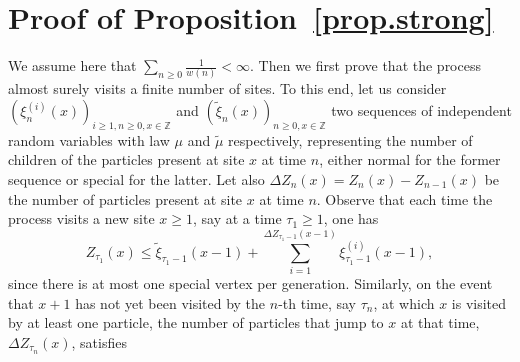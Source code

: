 \documentclass[10pt,a4paper]{amsart}
\newcommand{\1}{{\text{\Large $\mathfrak 1$}}}
\begin{document}


\section{Proof of Proposition~\ref{prop.strong}}\label{sec:propstrong}
We assume here that $\sum_{n\ge 0} \frac 1{w(n)}<\infty$. Then we first prove that the process almost surely visits a finite number of sites. To this end, let us consider $(\xi^{(i)}_n(x))_{i\ge 1, n\ge 0, x\in \mathbb Z}$ and 
$(\widetilde \xi_n(x))_{n\ge 0,x\in \mathbb Z}$  two sequences of independent random variables with law $\mu$ and $\widetilde \mu$ respectively, representing the number of children of the particles present at site $x$ at time $n$, either normal for the former sequence or special for the latter. Let also $\Delta Z_n(x) = Z_n(x) - Z_{n-1}(x)$ be the number of particles present at site $x$ at time $n$. 
Observe that each time the process visits a new site $x\ge 1$, say at a time $\tau_1\ge 1$, one has 
$$Z_{\tau_1}(x) \le \widetilde \xi_{\tau_1-1}(x-1) + \sum_{i=1}^{\Delta Z_{\tau_1-1}(x-1)} \xi^{(i)}_{\tau_1-1}(x-1),$$
since there is at most one special vertex per generation.  
Similarly, on the event that $x+1$ has not yet been visited by the $n$-th time, say $\tau_n$, at which $x$ is visited by at least one particle, the number of particles that jump to $x$ at that time, $\Delta Z_{\tau_n}(x)$, satisfies 
\end{document}
